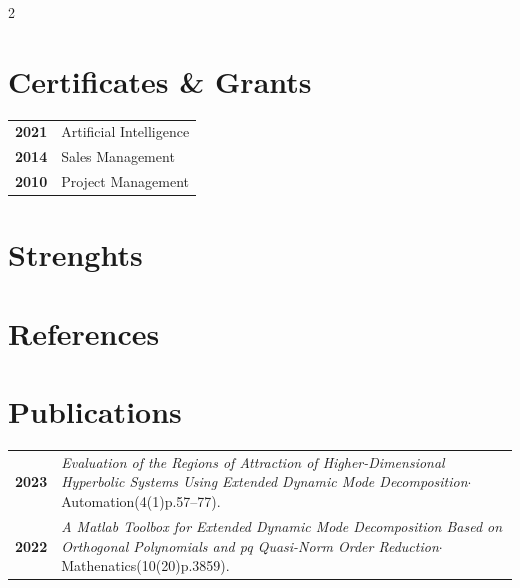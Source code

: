 \documentclass[10pt,a4paper,grey]{hipstercv}
\begin{document}
\begin{paracol}{2}
\begin{minipage}[t]{0.16\textwidth}
		 \hspace{1em}
	\end{minipage}

	\vspace{2em}

	\begin{minipage}[t]{0.3\textwidth}
		\section*{Certificates \& Grants}
		\begin{tabular}{>{\footnotesize\bfseries}r >{\footnotesize}p{}}
			2021 & Artificial Intelligence \\
			2014 & Sales Management        \\
			2010 & Project Management      \\
		\end{tabular}
		\section*{Strenghts}
		\section*{References}
	\end{minipage}\hfill
	\begin{minipage}[t]{0.37\textwidth}
		\section*{Publications}
		\begin{tabular}{>{\footnotesize\bfseries}r >{\footnotesize}p{}}
			2023 & \emph{Evaluation of the Regions of Attraction of Higher-Dimensional Hyperbolic Systems Using Extended Dynamic Mode Decomposition}$\cdot$Automation(4(1)p.57--77).  \\
			2022 & \emph{A Matlab Toolbox for Extended Dynamic Mode Decomposition Based on Orthogonal Polynomials and pq Quasi-Norm Order Reduction}$\cdot$Mathenatics(10(20)p.3859).
		\end{tabular}

\end{minipage}
\end{paracol}
\end{document}
